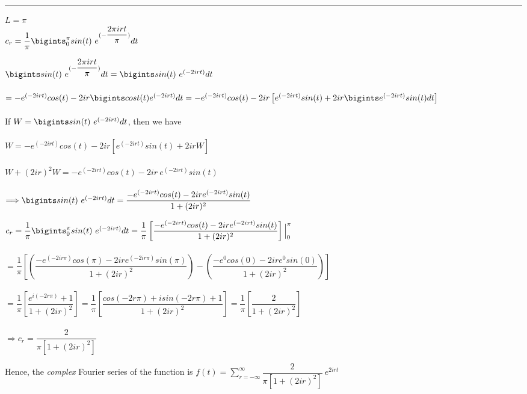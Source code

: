 \documentclass[fleqn]{article}
\begin{document}
\begin{enumerate}
      \textcolor{hwColor}{ 
        \rule{15cm}{0.4pt} 
      }
      
      \textcolor{hwColor}{
        $L=\pi$ \\
        $c_r=\dfrac{1}{\pi} \bigints_{0}^{\pi}sin(t) ~ e^{(-\dfrac{2\pi irt}{\pi})} dt$
      }

      \bigbreak

      \textcolor{hwColor}{
        $\bigints sin(t) ~ e^{(-\dfrac{2\pi irt}{\pi})} dt=\bigints sin(t) ~ e^{(-2irt)} dt$ \\
        \\
        $=-e^{(-2irt)} cos(t)-2ir \bigints cost(t) e^{(-2irt)} dt=-e^{(-2irt)} cos(t)-2ir\left[e^{(-2irt)} sin(t)+2ir \bigints e^{(-2irt)} sin(t) dt\right]$ \\
        \\
        If $W=\bigints sin(t) ~ e^{(-2irt)} dt$, then we have \\
        \\
        $W=-e^{(-2irt)} cos(t)-2ir\left[e^{(-2irt)} sin(t)+2ir W\right]$\\
        \\
        $W+(2ir)^2W=-e^{(-2irt)} cos(t)-2ir ~ e^{(-2irt)} sin(t)$\\
        \\
        $\Longrightarrow \bigints sin(t) ~ e^{(-2irt)} dt=\dfrac{-e^{(-2irt)} cos(t)-2ire^{(-2irt)} sin(t)}{1+(2ir)^2}$
      }

      \bigbreak

      \textcolor{hwColor}{
        $c_r=\dfrac{1}{\pi} \bigints_{0}^{\pi}sin(t) ~ e^{(-2irt)} dt=\dfrac{1}{\pi} \left[\dfrac{-e^{(-2irt)} cos(t)-2ire^{(-2irt)} sin(t)}{1+(2ir)^2}\right]\Big|_{0}^{\pi}$ \\
        \\
        $=\dfrac{1}{\pi} \left[(\dfrac{-e^{(-2ir \pi)} cos(\pi)-2ire^{(-2ir \pi)} sin(\pi)}{1+(2ir)^2})-(\dfrac{-e^0 cos(0)-2ire^0 sin(0)}{1+(2ir)^2})\right]$ \\
        \\
        $=\dfrac{1}{\pi} \left[\dfrac{e^{i(-2r\pi)}+1}{1+(2ir)^2}\right]=\dfrac{1}{\pi}\left[\dfrac{cos(-2r\pi)+isin(-2r\pi)+1}{1+(2ir)^2}\right]=\dfrac{1}{\pi}\left[\dfrac{2}{1+(2ir)^2}\right]$ \\
        \\
        $\Longrightarrow c_r=\dfrac{2}{\pi \left[1+(2ir)^2\right]}$
      }

      \textcolor{hwColor}{
        Hence, the \emph{complex} Fourier series of the function is $f(t)=\sum\limits_{r=-\infty}^{\infty} \dfrac{2}{\pi \left[1+(2ir)^2\right]}~e^{2irt}$ \\
      }


\end{enumerate}
\end{document}
